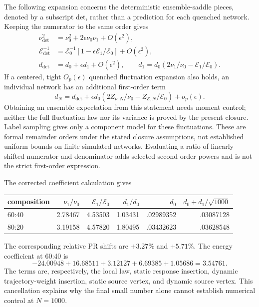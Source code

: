 The following expansion concerns the deterministic ensemble-saddle pieces,
denoted by a subscript $\mathrm{det}$, rather than a prediction for each
quenched network. Keeping the numerator to the same order gives
\begin{align*}
 \nu_{\mathrm{det}}^2&=\nu_0^2+2\epsilon\nu_0\nu_1+O(\epsilon^2),\\
 \mathcal E_{\mathrm{det}}^{-1}&=\mathcal E_0^{-1}
             [1-\epsilon\mathcal E_1/\mathcal E_0]+O(\epsilon^2),\\
 d_{\mathrm{det}}&=d_0+\epsilon d_1+O(\epsilon^2),\qquad
 d_1=d_0\left(2\nu_1/\nu_0-\mathcal E_1/\mathcal E_0\right).
\end{align*}
If a centered, tight $O_p(\epsilon)$ quenched fluctuation expansion also holds,
an individual network has an additional first-order term
\[
 d_N=d_{\mathrm{det}}+\epsilon d_0
   (2Z_{\nu,N}/\nu_0-Z_{\mathcal E,N}/\mathcal E_0)+o_p(\epsilon).
\]
Obtaining an ensemble expectation from this statement needs moment control;
neither the full fluctuation law nor its variance is proved by the present
closure. Label sampling gives only a component model for these fluctuations.
These are formal remainder orders under the stated closure assumptions, not
established uniform bounds on finite simulated networks. Evaluating a ratio
of linearly shifted numerator and denominator adds selected second-order
powers and is not the strict first-order expression.

The corrected coefficient calculation gives
\begin{center}\small
\begin{tabular}{lrrrrr}\toprule
composition & $\nu_1/\nu_0$ & $\mathcal E_1/\mathcal E_0$ &
 $d_1/d_0$ & $d_0$ & $d_0+d_1/\sqrt{1000}$\\\midrule
60:40&2.78467&4.53503&1.03431&.02989352&.03087128\\
80:20&3.19158&4.57820&1.80495&.03432623&.03628548\\\bottomrule
\end{tabular}
\end{center}
The corresponding relative PR shifts are $+3.27\%$ and $+5.71\%$. The
energy coefficient at 60:40 is
\[
 -24.00948+16.68511+3.12127+6.69385+1.05686=3.54761.
\]
The terms are, respectively, the local law, static response insertion,
dynamic trajectory-weight insertion, static source vertex, and dynamic
source vertex. This cancellation explains why the final small number alone
cannot establish numerical control at $N=1000$.

